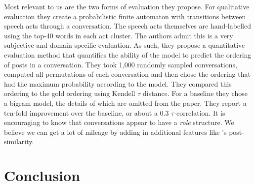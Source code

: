 \documentclass{article}
\begin{document}
Most relevant to us are the two forms of evaluation they propose. For
qualitative evaluation they create a probabilistic finite automaton with
transitions between speech acts through a conversation. The speech acts
themselves are hand-labelled using the top-40 words in each act cluster. The 
authors admit this is a very subjective and domain-specific evaluation. As such,
they propose a quantitative evaluation method that quantifies the ability of
the model to predict the ordering of posts in a conversation. They took
1,000 randomly sampled conversations, computed all permutations
of each conversation and then chose the ordering that had the maximum
probability according to the model. They compared this ordering to the gold
ordering using Kendell $\tau$ distance. For a baseline they chose a bigram
model, the details of which are omitted from the paper. They report a ten-fold improvement
over the baseline, or about a 0.3 $\tau$-correlation. It is encouraging to know
that conversations appear to have a \textit{role} structure. We believe we can get a lot of mileage
by adding in additional features like \cite{Wang2008a}'s post-similarity. 


\section{Conclusion}

{}

\end{document}
